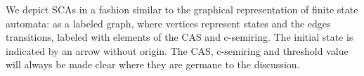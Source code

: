 \documentclass[a4paper]{article}
\newcommand{\myrightarrow}[1]{\mathrel{\raisebox{-3pt}{$\xrightarrow{#1}$}}}
\theoremstyle{definition}
\begin{document}

We depict SCAs in a fashion similar to the graphical representation of finite state automata: as a labeled graph, where vertices represent states and the edges transitions, labeled with elements of the CAS and c-semiring. The initial state is indicated by an arrow without origin. The CAS, c-semiring and threshold value will always be made clear where they are germane to the discussion.
\end{document}
